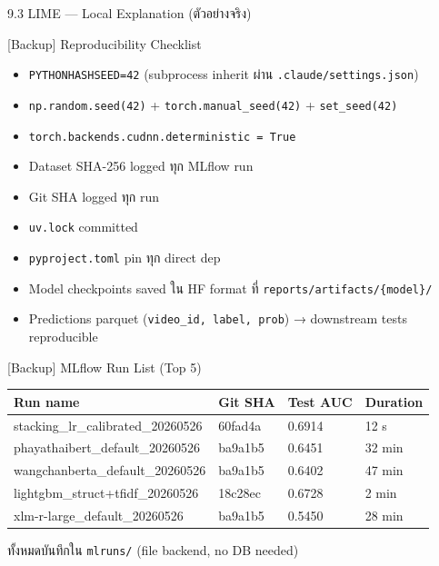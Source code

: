 \documentclass[aspectratio=169,11pt,xcolor=dvipsnames]{beamer}
\begin{document}
\begin{frame}{9.3 LIME — Local Explanation (ตัวอย่างจริง)}
\begin{center}
\begin{frame}{[Backup] Reproducibility Checklist}
  \begin{itemize}
    \item \texttt{PYTHONHASHSEED=42} (subprocess inherit ผ่าน \texttt{.claude/settings.json})
    \item \texttt{np.random.seed(42)} + \texttt{torch.manual\_seed(42)} + \texttt{set\_seed(42)}
    \item \texttt{torch.backends.cudnn.deterministic = True}
    \item Dataset SHA-256 logged ทุก MLflow run
    \item Git SHA logged ทุก run
    \item \texttt{uv.lock} committed
    \item \texttt{pyproject.toml} pin ทุก direct dep
    \item Model checkpoints saved ใน HF format ที่ \texttt{reports/artifacts/\{model\}/}
    \item Predictions parquet (\texttt{video\_id, label, prob}) → downstream tests reproducible
  \end{itemize}
\end{frame}

\begin{frame}{[Backup] MLflow Run List (Top 5)}
  \footnotesize
  \begin{tabular}{p{4.5cm}p{2.2cm}p{1.4cm}p{1.4cm}}
    \toprule
    \textbf{Run name} & \textbf{Git SHA} & \textbf{Test AUC} & \textbf{Duration}\\
    \midrule
    stacking\_lr\_calibrated\_20260526 & 60fad4a & 0.6914 & 12 s\\
    phayathaibert\_default\_20260526   & ba9a1b5 & 0.6451 & 32 min\\
    wangchanberta\_default\_20260526   & ba9a1b5 & 0.6402 & 47 min\\
    lightgbm\_struct+tfidf\_20260526   & 18c28ec & 0.6728 & 2 min\\
    xlm-r-large\_default\_20260526     & ba9a1b5 & 0.5450 & 28 min\\
    \bottomrule
  \end{tabular}
  \vspace{0.6em}
  \begin{center}
    \scriptsize ทั้งหมดบันทึกใน \texttt{mlruns/} (file backend, no DB needed)
  \end{center}
\end{frame}


\end{center}
\end{frame}
\end{document}
